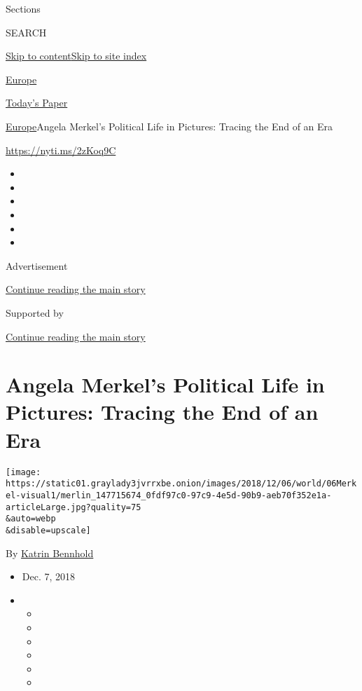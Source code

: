 Sections

SEARCH

\protect\hyperlink{site-content}{Skip to
content}\protect\hyperlink{site-index}{Skip to site index}

\href{https://www.nytimes3xbfgragh.onion/section/world/europe}{Europe}

\href{https://myaccount.nytimes3xbfgragh.onion/auth/login?response_type=cookie\&client_id=vi}{}

\href{https://www.nytimes3xbfgragh.onion/section/todayspaper}{Today's
Paper}

\href{/section/world/europe}{Europe}\textbar{}Angela Merkel's Political
Life in Pictures: Tracing the End of an Era

\url{https://nyti.ms/2zKoq9C}

\begin{itemize}
\item
\item
\item
\item
\item
\item
\end{itemize}

Advertisement

\protect\hyperlink{after-top}{Continue reading the main story}

Supported by

\protect\hyperlink{after-sponsor}{Continue reading the main story}

\hypertarget{angela-merkels-political-life-in-pictures-tracing-the-end-of-an-era}{%
\section{Angela Merkel's Political Life in Pictures: Tracing the End of
an
Era}\label{angela-merkels-political-life-in-pictures-tracing-the-end-of-an-era}}

\texttt{[image: https://static01.graylady3jvrrxbe.onion/images/2018/12/06/world/06Merkel-visual1/merlin\_147715674\_0fdf97c0-97c9-4e5d-90b9-aeb70f352e1a-articleLarge.jpg?quality=75\\\&auto=webp\\\&disable=upscale]}

By \href{https://www.nytimes3xbfgragh.onion/by/katrin-bennhold}{Katrin
Bennhold}

\begin{itemize}
\item
  Dec. 7, 2018
\item
  \begin{itemize}
  \item
  \item
  \item
  \item
  \item
  \item
  \end{itemize}
\end{itemize}

